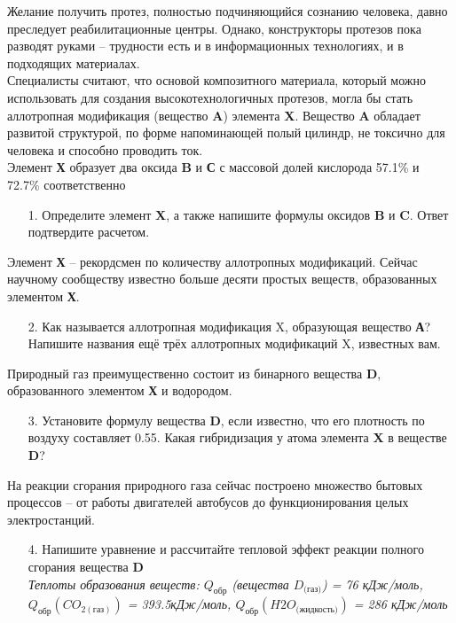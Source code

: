 
Желание получить протез, полностью подчиняющийся сознанию человека, давно преследует реабилитационные центры. Однако, конструкторы протезов пока разводят руками – трудности есть и в информационных технологиях, и в подходящих материалах. \\
Специалисты считают, что основой композитного материала, который можно использовать для создания высокотехнологичных протезов, могла бы стать аллотропная модификация (вещество \textbf{A}) элемента \textbf{X}. Вещество \textbf{A} обладает развитой структурой, по форме напоминающей полый цилиндр, не токсично для человека и способно проводить ток.\\
Элемент \textbf{Х} образует два оксида \textbf{B} и \textbf{С} с массовой долей кислорода 57.1\% и 72.7\% соответственно
\begin{enumerate}
\item[1.] Определите элемент \textbf{X}, а также напишите формулы оксидов \textbf{B} и \textbf{C}. Ответ подтвердите расчетом.
\end{enumerate}
Элемент \textbf{Х} – рекордсмен по количеству аллотропных модификаций. Сейчас научному сообществу известно больше десяти простых веществ, образованных элементом \textbf{Х}. 
\begin{enumerate}
\item[2.] Как называется аллотропная модификация X, образующая вещество \textbf{А}? Напишите названия ещё трёх аллотропных модификаций X, известных вам.
\end{enumerate}
Природный газ преимущественно состоит из бинарного вещества \textbf{D}, образованного элементом \textbf{Х} и водородом.
\begin{enumerate}
\item[3.] Установите формулу вещества \textbf{D}, если известно, что его плотность по воздуху составляет 0.55. Какая гибридизация у атома элемента \textbf{X} в веществе \textbf{D}?
\end{enumerate}
На реакции сгорания природного газа сейчас построено множество бытовых процессов – от работы двигателей автобусов до функционирования целых электростанций. 
\begin{enumerate}
\item[4.] Напишите уравнение и рассчитайте тепловой эффект реакции полного сгорания вещества \textbf{D}\\
\textit{Теплоты образования веществ: $Q_\text{обр}$ (вещества $D_\text{(газ)}$) = 76 кДж/моль,\\ $Q_\text{обр}(CO_{2(\text{газ})})$ = 393.5кДж/моль, $Q_\text{обр} (H2O_\text{(жидкость)})$ =  286 кДж/моль}
\end{enumerate}

